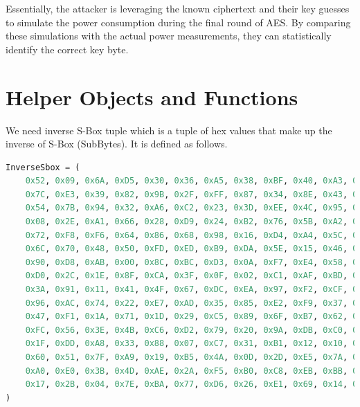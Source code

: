 \documentclass[12pt, letterpaper, oneside]{report}
\begin{document}
Essentially, the attacker is leveraging the known ciphertext and their key guesses to simulate the power consumption during the final round of AES. By comparing these simulations with the actual power measurements, they can statistically identify the correct key byte.


\section{Helper Objects and Functions}

We need inverse S-Box tuple which is a tuple of hex values that make up the inverse of S-Box (SubBytes). It is defined as follows.\\


\begin{lstlisting}[language=Python, caption=Inverse SBOX tuple]
    InverseSbox = (
    0x52, 0x09, 0x6A, 0xD5, 0x30, 0x36, 0xA5, 0x38, 0xBF, 0x40, 0xA3, 0x9E, 0x81, 0xF3, 0xD7, 0xFB,
    0x7C, 0xE3, 0x39, 0x82, 0x9B, 0x2F, 0xFF, 0x87, 0x34, 0x8E, 0x43, 0x44, 0xC4, 0xDE, 0xE9, 0xCB,
    0x54, 0x7B, 0x94, 0x32, 0xA6, 0xC2, 0x23, 0x3D, 0xEE, 0x4C, 0x95, 0x0B, 0x42, 0xFA, 0xC3, 0x4E,
    0x08, 0x2E, 0xA1, 0x66, 0x28, 0xD9, 0x24, 0xB2, 0x76, 0x5B, 0xA2, 0x49, 0x6D, 0x8B, 0xD1, 0x25,
    0x72, 0xF8, 0xF6, 0x64, 0x86, 0x68, 0x98, 0x16, 0xD4, 0xA4, 0x5C, 0xCC, 0x5D, 0x65, 0xB6, 0x92,
    0x6C, 0x70, 0x48, 0x50, 0xFD, 0xED, 0xB9, 0xDA, 0x5E, 0x15, 0x46, 0x57, 0xA7, 0x8D, 0x9D, 0x84,
    0x90, 0xD8, 0xAB, 0x00, 0x8C, 0xBC, 0xD3, 0x0A, 0xF7, 0xE4, 0x58, 0x05, 0xB8, 0xB3, 0x45, 0x06,
    0xD0, 0x2C, 0x1E, 0x8F, 0xCA, 0x3F, 0x0F, 0x02, 0xC1, 0xAF, 0xBD, 0x03, 0x01, 0x13, 0x8A, 0x6B,
    0x3A, 0x91, 0x11, 0x41, 0x4F, 0x67, 0xDC, 0xEA, 0x97, 0xF2, 0xCF, 0xCE, 0xF0, 0xB4, 0xE6, 0x73,
    0x96, 0xAC, 0x74, 0x22, 0xE7, 0xAD, 0x35, 0x85, 0xE2, 0xF9, 0x37, 0xE8, 0x1C, 0x75, 0xDF, 0x6E,
    0x47, 0xF1, 0x1A, 0x71, 0x1D, 0x29, 0xC5, 0x89, 0x6F, 0xB7, 0x62, 0x0E, 0xAA, 0x18, 0xBE, 0x1B,
    0xFC, 0x56, 0x3E, 0x4B, 0xC6, 0xD2, 0x79, 0x20, 0x9A, 0xDB, 0xC0, 0xFE, 0x78, 0xCD, 0x5A, 0xF4,
    0x1F, 0xDD, 0xA8, 0x33, 0x88, 0x07, 0xC7, 0x31, 0xB1, 0x12, 0x10, 0x59, 0x27, 0x80, 0xEC, 0x5F,
    0x60, 0x51, 0x7F, 0xA9, 0x19, 0xB5, 0x4A, 0x0D, 0x2D, 0xE5, 0x7A, 0x9F, 0x93, 0xC9, 0x9C, 0xEF,
    0xA0, 0xE0, 0x3B, 0x4D, 0xAE, 0x2A, 0xF5, 0xB0, 0xC8, 0xEB, 0xBB, 0x3C, 0x83, 0x53, 0x99, 0x61,
    0x17, 0x2B, 0x04, 0x7E, 0xBA, 0x77, 0xD6, 0x26, 0xE1, 0x69, 0x14, 0x63, 0x55, 0x21, 0x0C, 0x7D,
)
\end{lstlisting} 

\newpage
\end{document}
